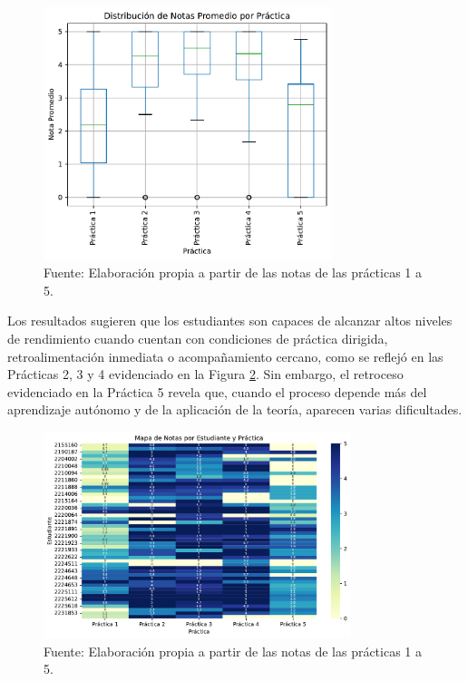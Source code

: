 \documentclass[letter,oneside,12pt,spanish]{report}
\begin{document}
\begin{figure}[ht]
	\centering
	\includegraphics[width=0.75\textwidth]{Figs/Promedio_Notas.pdf}
	\label{fig:Promedio}
	\\Fuente: Elaboración propia a partir de las notas de las prácticas 1 a 5.
\end{figure}

Los resultados sugieren que los estudiantes son capaces de alcanzar altos niveles de rendimiento cuando cuentan con condiciones de práctica dirigida, retroalimentación inmediata o acompañamiento cercano, como se reflejó en las Prácticas 2, 3 y 4 evidenciado en la Figura \ref{fig:Mapa}. Sin embargo, el retroceso evidenciado en la Práctica 5 revela que, cuando el proceso depende más del aprendizaje autónomo y de la aplicación de la teoría, aparecen varias dificultades.

\begin{figure}[ht]
	\centering
	\includegraphics[width=0.8\textwidth]{Figs/Mapa_Notas.pdf}
	\label{fig:Mapa}
	\\Fuente: Elaboración propia a partir de las notas de las prácticas 1 a 5.
\end{figure}
\end{document}
